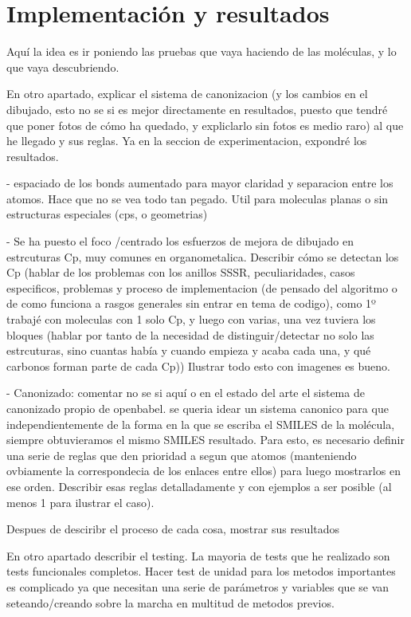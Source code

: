 
\chapter{Implementación y resultados}

Aquí la idea es ir poniendo las pruebas que vaya haciendo de las moléculas, y lo que vaya descubriendo.

En otro apartado, explicar el sistema de canonizacion (y los cambios en el dibujado, esto no se si es mejor directamente en resultados, puesto que tendré que poner fotos de cómo ha quedado, y expliclarlo sin fotos es medio raro) al que he llegado y sus reglas. Ya en la seccion de experimentacion, expondré los resultados.

 - espaciado de los bonds aumentado para mayor claridad y separacion entre los atomos. Hace que no se vea todo tan pegado. Util para moleculas planas o sin estructuras especiales (cps, o geometrias)

 - Se ha puesto el foco /centrado los esfuerzos de mejora de dibujado en estrcuturas Cp, muy comunes en organometalica. Describir cómo se detectan los Cp (hablar de los problemas con los anillos SSSR, peculiaridades, casos especificos, problemas y proceso de implementacion (de pensado del algoritmo o de como funciona a rasgos generales sin entrar en tema de codigo), como 1º trabajé con moleculas con 1 solo Cp, y luego con varias, una vez tuviera los bloques (hablar por tanto de la necesidad de distinguir/detectar no solo las estrcuturas, sino cuantas había y cuando empieza y acaba cada una, y qué carbonos forman parte de cada Cp))
 Ilustrar todo esto con imagenes es bueno.

 - Canonizado: comentar no se si aquí o en el estado del arte el sistema de canonizado propio de openbabel. se queria idear un sistema canonico para que independientemente de la forma en la que se escriba el SMILES de la molécula, siempre obtuvieramos el mismo SMILES resultado. Para esto, es necesario definir una serie de reglas que den prioridad a segun que atomos (manteniendo ovbiamente la correspondecia de los enlaces entre ellos) para luego mostrarlos en ese orden. Describir esas reglas detalladamente y con ejemplos a ser posible (al menos 1 para ilustrar el caso).


Despues de desciribr el proceso de cada cosa, mostrar sus resultados

 En otro apartado describir el testing. La mayoria de tests que he realizado son tests funcionales completos. Hacer test de unidad para los metodos importantes es complicado ya que necesitan una serie de parámetros y variables que se van seteando/creando sobre la marcha en multitud de metodos previos.